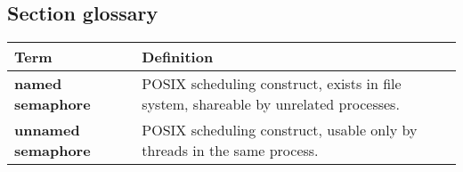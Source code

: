 \subsection{Section glossary}
\centering
\begin{tabular}{>{\raggedright}p{} >{\raggedright\arraybackslash}p{}}
\toprule
\textbf{Term} & \textbf{Definition} \\
\midrule
\textbf{named semaphore} & POSIX scheduling construct, exists in file system, shareable by unrelated processes. \\
\textbf{unnamed semaphore} & POSIX scheduling construct, usable only by threads in the same process. \\
\bottomrule
\end{tabular}
\vspace{\baselineskip}

